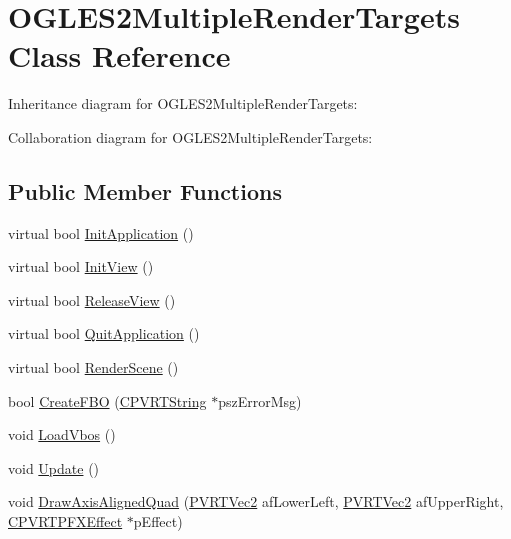 \hypertarget{class_o_g_l_e_s2_multiple_render_targets}{\section{O\+G\+L\+E\+S2\+Multiple\+Render\+Targets Class Reference}
\label{class_o_g_l_e_s2_multiple_render_targets}
}


Inheritance diagram for O\+G\+L\+E\+S2\+Multiple\+Render\+Targets\+:


Collaboration diagram for O\+G\+L\+E\+S2\+Multiple\+Render\+Targets\+:
\subsection*{Public Member Functions}
\begin{DoxyCompactItemize}
\item 
virtual bool \hyperlink{class_o_g_l_e_s2_multiple_render_targets_aa8557d7bf6c1870de6609b4f469dfb58}{Init\+Application} ()
\item 
virtual bool \hyperlink{class_o_g_l_e_s2_multiple_render_targets_a476409a90c225721471d14bd0bacb660}{Init\+View} ()
\item 
virtual bool \hyperlink{class_o_g_l_e_s2_multiple_render_targets_aa7231be09393e9c113e0f86d429eeaac}{Release\+View} ()
\item 
virtual bool \hyperlink{class_o_g_l_e_s2_multiple_render_targets_a7ae91ab4b42bd0d3b794b5ababdabe71}{Quit\+Application} ()
\item 
virtual bool \hyperlink{class_o_g_l_e_s2_multiple_render_targets_a63726e5b36a4e95b554e0d3c985a34fe}{Render\+Scene} ()
\item 
bool \hyperlink{class_o_g_l_e_s2_multiple_render_targets_a009f45a9cf4ab66fa0d12ab59d75df05}{Create\+F\+B\+O} (\hyperlink{class_c_p_v_r_t_string}{C\+P\+V\+R\+T\+String} $\ast$psz\+Error\+Msg)
\item 
void \hyperlink{class_o_g_l_e_s2_multiple_render_targets_a10d8cc49d0b21aefb285cfd223b6b4d7}{Load\+Vbos} ()
\item 
void \hyperlink{class_o_g_l_e_s2_multiple_render_targets_a01c031bc1645268ac58c1570559f7402}{Update} ()
\item 
void \hyperlink{class_o_g_l_e_s2_multiple_render_targets_a8518fbac08a0f42c742985ca1818c729}{Draw\+Axis\+Aligned\+Quad} (\hyperlink{struct_p_v_r_t_vec2}{P\+V\+R\+T\+Vec2} af\+Lower\+Left, \hyperlink{struct_p_v_r_t_vec2}{P\+V\+R\+T\+Vec2} af\+Upper\+Right, \hyperlink{class_c_p_v_r_t_p_f_x_effect}{C\+P\+V\+R\+T\+P\+F\+X\+Effect} $\ast$p\+Effect)

\end{DoxyCompactItemize}
